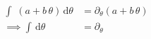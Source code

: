 \documentclass[15pt,landscape]{article}
\def\be{\begin{equation}}
\def\ee{\end{equation}}
\newcommand{\del}{\partial}
\begin{document}
\be
\begin{split}
\int \;(a+b\, \theta ) \, \mathrm{d}\theta &= \del_{\theta}(a+b\, \theta )\\
\implies \int  \, \mathrm{d}\theta &= \del_{\theta}
\end{split}
\ee
\end{document}
